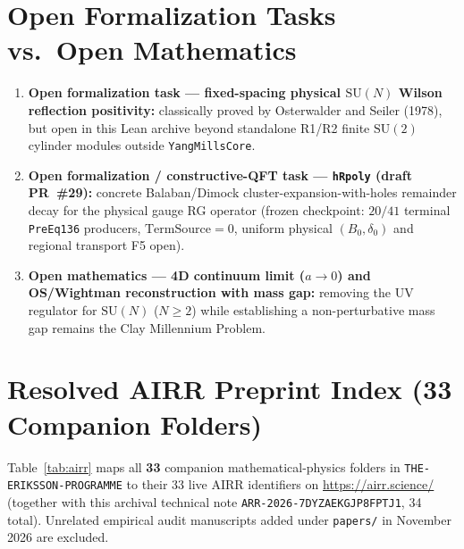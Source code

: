 \documentclass[11pt]{article}
\begin{document}
\section{Open Formalization Tasks vs.\ Open Mathematics}

\begin{enumerate}
  \item \textbf{Open formalization task — fixed-spacing physical $\mathrm{SU}(N)$ Wilson reflection positivity:}
  classically proved by Osterwalder and Seiler (1978), but open in this Lean archive beyond
  standalone R1/R2 finite $\mathrm{SU}(2)$ cylinder modules outside \texttt{YangMillsCore}.
  \item \textbf{Open formalization / constructive-QFT task — \texttt{hRpoly} (draft PR~\#29):}
  concrete Balaban/Dimock cluster-expansion-with-holes remainder decay for the physical gauge
  RG operator (frozen checkpoint: $20/41$ terminal \texttt{PreEq136} producers,
  $\mathrm{TermSource}=0$, uniform physical $(B_0,\delta_0)$ and regional transport F5 open).
  \item \textbf{Open mathematics — 4D continuum limit ($a \to 0$) and OS/Wightman reconstruction with mass gap:}
  removing the UV regulator for $\mathrm{SU}(N)$ ($N \ge 2$) while establishing a
  non-perturbative mass gap remains the Clay Millennium Problem.
\end{enumerate}

\section{Resolved AIRR Preprint Index (33 Companion Folders)}

Table~\ref{tab:airr} maps all \textbf{33} companion mathematical-physics folders in
\texttt{THE-ERIKSSON-PROGRAMME} to their 33 live AIRR identifiers on
\url{https://airr.science/} (together with this archival technical note
\texttt{ARR-2026-7DYZAEKGJP8FPTJ1}, 34 total). Unrelated empirical audit manuscripts added
under \texttt{papers/} in November 2026 are excluded.
\end{document}
